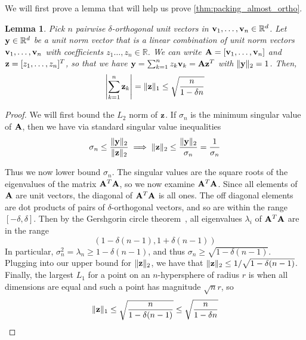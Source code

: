 \documentclass{article} %
\theoremstyle{plain}
\newtheorem{lemma}{Lemma}
\theoremstyle{definition}
\begin{document}
We will first prove a lemma that will help us prove \cref{thm:packing_almost_ortho}.
\begin{lemma} 
\label{lem:norm_helper_lemma}
Pick $n$ pairwise $\delta$-orthogonal unit vectors in $\mathbf{v}_{1},\ldots,\mathbf{v}_{n} \in \mathbb{R}^d$. Let $\mathbf{y} \in \mathbb{R}^d$ be a unit norm vector that is a linear combination of unit norm vectors $\mathbf{v}_{1}, \ldots, \mathbf{v}_{n}$ with coefficients $z_1 \ldots, z_n \in \mathbb{R}$. We can write ${\mathbf A} = [\mathbf{v}_{1}, \ldots, \mathbf{v}_{n}]$ and $\mathbf{z}=[z_1, \ldots, z_n]^T$, so that we have $\mathbf{y} = \sum_{k = 1}^{n} z_{k} \mathbf{v}_{k} = {\mathbf A} \mathbf{z}^T$ with $\lVert \mathbf{y} \rVert_2 = 1$. Then, $$\left|\sum_{k=1}^{n} \mathbf{z}_{k} \right| = \lVert \mathbf{z} \rVert_1 \le \sqrt{\frac{n}{1 - \delta n}}$$

\end{lemma}
\begin{proof}
We will first bound the $L_2$ norm of $\mathbf{z}$. If $\sigma_{n}$ is the minimum singular value of ${\mathbf A}$, then we have via standard singular value inequalities~\citep{high21s}
    $$\sigma_{n} \le \frac{\lVert \mathbf{y} \rVert_2}{\lVert \mathbf{z} \rVert_2} \implies \lVert \mathbf{z} \rVert_2 \le \frac{\lVert \mathbf{y} \rVert_2}{\sigma_{n}} = \frac{1}{\sigma_{n}} $$

Thus we now lower bound $\sigma_{n}$. The singular values are the square roots of the eigenvalues of the matrix ${\mathbf A}^T{\mathbf A}$, so we now examine ${\mathbf A}^T{\mathbf A}$. Since all elements of ${\mathbf A}$ are unit vectors, the diagonal of ${\mathbf A}^T{\mathbf A}$ is all ones. The off diagonal elements are dot products of pairs of $\delta$-orthogonal vectors, and so are within the range $[-\delta, \delta]$. Then by the Gershgorin circle theorem~\citep{gershgorin1931uber},
all eigenvalues $\lambda_i$ of ${\mathbf A}^T{\mathbf A}$ are in the range
$$(1 - \delta(n - 1), 1 + \delta(n - 1))$$
In particular, $\sigma_{n}^2 = \lambda_{n} \ge 1 - \delta(n - 1)$, and thus $\sigma_{n} \ge \sqrt{1 - \delta(n - 1)}$. Plugging into our upper bound for $\lVert \mathbf{z}\rVert_2$, we have that $\lVert \mathbf{z} \rVert_2 \le 1/\sqrt{1 - \delta(n - 1)}$. Finally, the largest $L_1$ for a point on an $n$-hypersphere of radius $r$ is when all dimensions are equal and such a point has magnitude $\sqrt{n}r$, so
$$\lVert \mathbf{z} \rVert_1 \le \sqrt{\frac{n}{1 - \delta(n - 1)}} \le \sqrt{\frac{n}{1 - \delta n}}$$
\end{proof}
\end{document}
